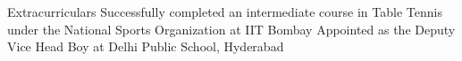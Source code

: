 
\begin{rubric}{Extracurriculars}
	\entry*[2019] Successfully completed an intermediate course in Table Tennis under the National Sports Organization at IIT Bombay
	\entry*[2016] Appointed as the Deputy Vice Head Boy at Delhi Public School, Hyderabad
\end{rubric}